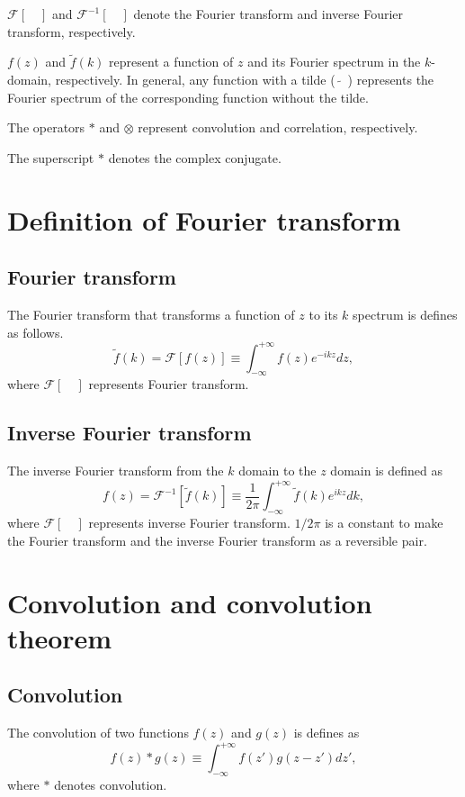 \documentclass[a4paper]{article}
\newcommand{\ftf}[1]{{\mathcal{F}\left[#1\right]\xspace}}
\newcommand{\iftf}[1]{{\mathcal{F}^{-1}\left[#1\right]\xspace}}
\newcommand{\ftt}[1]{{\tilde{#1}\xspace}}
\begin{document}
$\ftf{\quad}$ and $\iftf{\quad}$ denote the Fourier transform and inverse Fourier transform, respectively.

$f(z)$ and $\ftt{f}(k)$ represent a function of $z$ and its Fourier spectrum in the $k$-domain, respectively.
In general, any function with a tilde ($\tilde{\quad}$) represents the Fourier spectrum of the corresponding function without the tilde.

The operators $*$ and $\otimes$ represent convolution and correlation, respectively.

The superscript $*$ denotes the complex conjugate.

\section{Definition of Fourier transform}
\subsection{Fourier transform}
The Fourier transform that transforms a function of $z$ to its $k$ spectrum is defines as
follows.
\begin{equation}
	\ftt{f}(k) = \ftf{f(z)} \equiv \int^{+\infty}_{-\infty} f(z) e^{-ikz}dz,
\end{equation}
where $\ftf{\quad}$ represents Fourier transform.

\subsection{Inverse Fourier transform}
The inverse Fourier transform from the $k$ domain to the $z$ domain is defined as
\begin{equation}
	{f}(z) = \iftf{\ftt{f}(k)} \equiv \frac{1}{2\pi} \int^{+\infty}_{-\infty} \ftt{f}(k) e^{ikz}dk,
\end{equation}
where $\ftf{\quad}$ represents inverse Fourier transform.
$1/2 \pi$ is a constant to make the Fourier transform and the inverse Fourier transform as a reversible pair.

\section{Convolution and convolution theorem}
\subsection{Convolution}
The convolution of two functions $f(z)$ and $g(z)$ is defines as
\begin{equation}
	f(z)*g(z) \equiv \int_{-\infty}^{+\infty} f\left(z'\right)g\left(z-z'\right	)dz',
\end{equation}
where $*$ denotes convolution.
\end{document}
